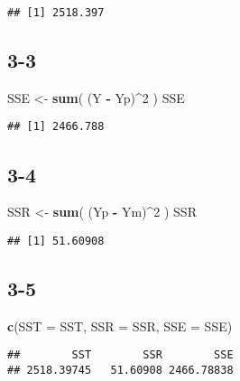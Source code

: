 \documentclass[
]{article}
\newenvironment{Shaded}{\begin{snugshade}}{\end{snugshade}}
\newcommand{\AttributeTok}[1]{\textcolor[rgb]{0.13,0.29,0.53}{#1}}
\newcommand{\DecValTok}[1]{\textcolor[rgb]{0.00,0.00,0.81}{#1}}
\newcommand{\FunctionTok}[1]{\textcolor[rgb]{0.13,0.29,0.53}{\textbf{#1}}}
\newcommand{\NormalTok}[1]{#1}
\newcommand{\OtherTok}[1]{\textcolor[rgb]{0.56,0.35,0.01}{#1}}
\newcommand{\SpecialCharTok}[1]{\textcolor[rgb]{0.81,0.36,0.00}{\textbf{#1}}}
\begin{document}
\begin{verbatim}
## [1] 2518.397
\end{verbatim}

\subsection{3-3}\label{section-13}

\begin{Shaded}
\begin{Highlighting}[]
\NormalTok{SSE }\OtherTok{\textless{}{-}} \FunctionTok{sum}\NormalTok{( (Y }\SpecialCharTok{{-}}\NormalTok{ Yp)}\SpecialCharTok{\^{}}\DecValTok{2}\NormalTok{ )}
\NormalTok{SSE}
\end{Highlighting}
\end{Shaded}

\begin{verbatim}
## [1] 2466.788
\end{verbatim}

\subsection{3-4}\label{section-14}

\begin{Shaded}
\begin{Highlighting}[]
\NormalTok{SSR }\OtherTok{\textless{}{-}} \FunctionTok{sum}\NormalTok{( (Yp }\SpecialCharTok{{-}}\NormalTok{ Ym)}\SpecialCharTok{\^{}}\DecValTok{2}\NormalTok{ )}
\NormalTok{SSR}
\end{Highlighting}
\end{Shaded}

\begin{verbatim}
## [1] 51.60908
\end{verbatim}

\subsection{3-5}\label{section-15}

\begin{Shaded}
\begin{Highlighting}[]
\FunctionTok{c}\NormalTok{(}\AttributeTok{SST =}\NormalTok{ SST, }\AttributeTok{SSR =}\NormalTok{ SSR, }\AttributeTok{SSE =}\NormalTok{ SSE)}
\end{Highlighting}
\end{Shaded}

\begin{verbatim}
##        SST        SSR        SSE 
## 2518.39745   51.60908 2466.78838
\end{verbatim}
\end{document}
